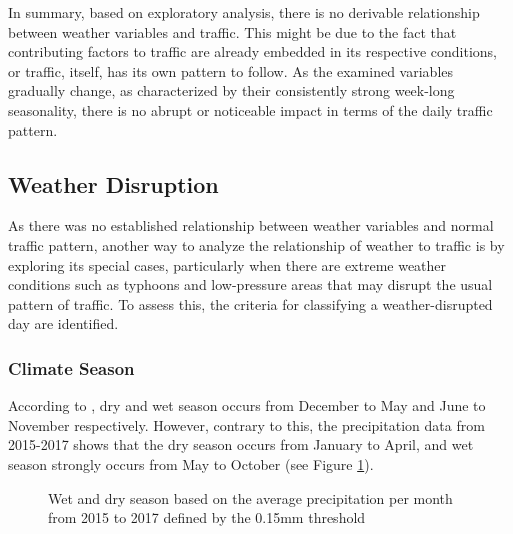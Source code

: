 In summary, based on exploratory analysis, there is no derivable relationship between weather variables and traffic. This might be due to the fact that contributing factors to traffic are already embedded in its respective conditions, or traffic, itself, has its own pattern to follow. As the examined variables gradually change, as characterized by their consistently strong week-long seasonality, there is no abrupt or noticeable impact in terms of the daily traffic pattern.

\subsection{Weather Disruption}
As there was no established relationship between weather variables and normal traffic pattern, another way to analyze the relationship of weather to traffic is by exploring its special cases, particularly when there are extreme weather conditions such as typhoons and low-pressure areas that may disrupt the usual pattern of traffic. To assess this, the criteria for classifying a weather-disrupted day are identified.

\subsubsection{Climate Season}

According to , dry and wet season occurs from December to May and June to November respectively. However, contrary to this, the precipitation data from 2015-2017 shows that the dry season occurs from January to April, and wet season strongly occurs from May to October (see Figure \ref{figure_ave_precip}).

\begin{figure}[!t]
  \centering
  \captionsetup{justification=centering}
  \caption{Wet and dry season based on the average precipitation per month from 2015 to 2017 defined by the 0.15mm threshold}
\label{figure_ave_precip}
\end{figure}


